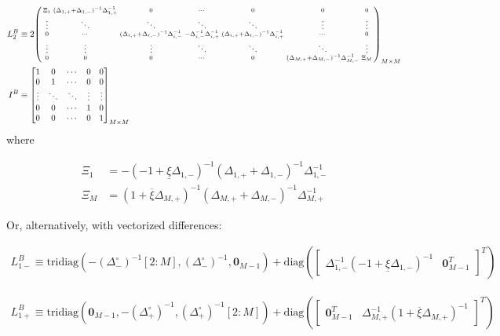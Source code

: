 \documentclass[11pt]{article}
\newcommand{\tridiag}{\ensuremath{\mathrm{tridiag}}}
\newcommand{\diag}{\ensuremath{\mathrm{diag}}}
\newenvironment{psmallmatrix}
{\left(\begin{smallmatrix}}
	{\end{smallmatrix}\right)}
\theoremstyle{definition}
\begin{document}
\begin{align}
L_2^B &\equiv 2 \begin{psmallmatrix}
\Xi_1 &
(\Delta_{1,+}+\Delta_{1,-})^{-1} \Delta_{1,+}^{-1}
&0&\cdots&0&0&0 \\
\vdots&\ddots&\ddots&\ddots&\ddots&\vdots&\vdots\\
0&\cdots&
(\Delta_{i,+}+\Delta_{i,-})^{-1} \Delta_{i,-}^{-1} &
-\Delta_{i,-}^{-1} \Delta_{i,+}^{-1}  &
 (\Delta_{i,+}+\Delta_{i,-})^{-1} \Delta_{i,+}^{-1}&\cdots&0 \\
\vdots&\vdots&\vdots&\ddots&\ddots&\ddots&\vdots\\
0&0&0&\cdots&0&(\Delta_{M,+}+\Delta_{M,-})^{-1} \Delta_{M,-}^{-1}&\Xi_M
\end{psmallmatrix}_{M\times M}\label{eq:L-2} \\
I^B &\equiv \begin{bmatrix}
1 & 0 & \cdots & 0 & 0 \\
0 & 1 & \cdots & 0 & 0 \\
\vdots  & \ddots & \ddots &  \vdots  & \vdots   \\
0 & 0 & \cdots & 1 & 0 \\
0 & 0 & \cdots & 0 & 1
\end{bmatrix}_{M\times M}
\end{align}
where

\begin{align}
\Xi_{1} &= - (-1 + \underline{\xi} \Delta_{1,-})^{-1} (\Delta_{1,+} + \Delta_{1,-})^{-1}  \Delta_{1,-}^{-1} \\
\Xi_{M} &=  (1 + \overline{\xi} \Delta_{M,+})^{-1} (\Delta_{M,+} + \Delta_{M,-})^{-1}  \Delta_{M,+}^{-1} 
\end{align}


Or, alternatively, with vectorized differences:


\begin{align}
{L}_{1-}^B \equiv
\tridiag \left(-(\Delta_-^\circ)^{-1}[2:M], (\Delta_-^\circ )^{-1}, \mathbf{0}_{M-1}  \right) +
\diag\left( 
\begin{bmatrix}
\Delta^{-1}_{1,-} (-1 + \underline{\xi} \Delta_{1,-})^{-1} &
\mathbf{0}_{M-1}^T
\end{bmatrix}^T
 \right)
\end{align}

\begin{align}
{L}_{1+}^B \equiv
\tridiag \left(\mathbf{0}_{M-1}, -(\Delta_+^\circ )^{-1}, (\Delta_+^\circ)^{-1}[2:M]  \right) +
\diag\left( 
\begin{bmatrix}
\mathbf{0}_{M-1}^T &
\Delta^{-1}_{M,+} (1 + \overline{\xi} \Delta_{M,+})^{-1}
\end{bmatrix}^T
\right)
\end{align}
\end{document}
